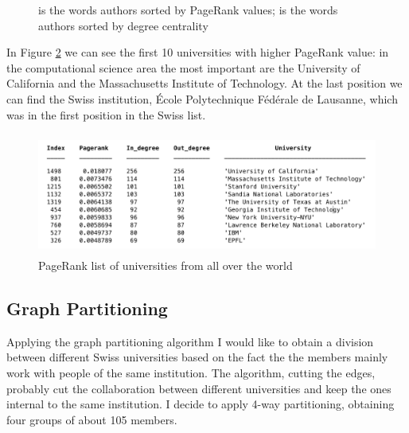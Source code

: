 \documentclass[]{usiinfbachelorproject}
\begin{document}
\begin{figure}[ht]
	\centering
	\caption{  is the words authors sorted by PageRank values;   is the words authors sorted by degree centrality}
	\label{fig:PRAuthorW}
\end{figure}

In Figure \ref{fig:PRuniW} we can see the first 10 universities with higher PageRank value: in the computational science area the most important are the University of California and the Massachusetts Institute of Technology. At the last position we can find the Swiss institution, \'{E}cole Polytechnique F\'{e}d\'{e}rale de Lausanne, which was in the first position in the Swiss list.

\begin{figure}[tb]
	\centering
	\includegraphics[height=4cm]{img/Analysis_world/pr_uni_10}
	\caption{PageRank list of universities from all over the world}
	\label{fig:PRuniW}
\end{figure}

\subsection{Graph Partitioning}
Applying the graph partitioning algorithm I would like to obtain a division between different  Swiss universities based on the fact the the members mainly work with people of the same institution. The algorithm, cutting the edges, probably cut the collaboration between different universities and keep the ones internal to the same institution. I decide to apply 4-way partitioning, obtaining four groups of about 105 members. 
\end{document}
